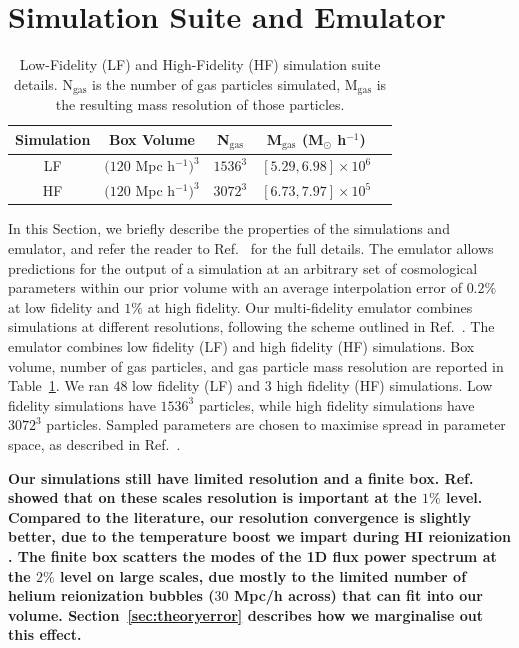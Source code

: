 \section{Simulation Suite and Emulator}
\label{sec:emulator}
\label{sec:simulations}

\begin{table}
	\centering
     \begin{tabular}{|c|c|c|c|c|}
		\hline
		Simulation & Box Volume & N$_{\text{gas}}$ & M$_{\text{gas}}$ (M$_{\odot}$ h$^{-1}$)\\
		\hline
		LF & $(120$ Mpc h$^{-1})^3$ & $1536^3$ & $[5.29, 6.98]\times10^6$\\
		HF & $(120$ Mpc h$^{-1})^3$ & $3072^3$ & $[6.73, 7.97]\times10^5$\\
		\hline
	\end{tabular}
    \caption{\label{table:simulations}
    Low-Fidelity (LF) and High-Fidelity (HF) simulation suite details.
    N$_{\text{gas}}$ is the number of gas particles simulated, M$_{\text{gas}}$ is the resulting mass resolution of those particles.}
\end{table}

In this Section, we briefly describe the properties of the simulations and emulator, and refer the reader to Ref.~\cite{2023simsuite} for the full details.
The emulator allows predictions for the output of a simulation at an arbitrary set of cosmological parameters within our prior volume with an average interpolation error of $0.2\%$ at low fidelity and $1\%$ at high fidelity.
Our multi-fidelity emulator combines simulations at different resolutions, following the scheme outlined in Ref.~\cite{2022MNRAS.517.3200F}.
The emulator combines low fidelity (LF) and high fidelity (HF) simulations.
Box volume, number of gas particles, and gas particle mass resolution are reported in Table~\ref{table:simulations}.
We ran $48$ low fidelity (LF) and $3$ high fidelity (HF) simulations.
Low fidelity simulations have $1536^3$ particles, while high fidelity simulations have $3072^3$ particles.
Sampled parameters are chosen to maximise spread in parameter space, as described in Ref.~\cite{2023simsuite}. 

\textbf{Our simulations still have limited resolution and a finite box. Ref.~\cite{2023simsuite} showed that on these scales resolution is important at the $1\%$ level. Compared to the literature, our resolution convergence is slightly better, due to the temperature boost we impart during HI reionization \cite{2019ApJ...874..154D}. The finite box scatters the modes of the 1D flux power spectrum at the $2\%$ level on large scales, due mostly to the limited number of helium reionization bubbles ($30$ Mpc/h across) that can fit into our volume. Section~\ref{sec:theoryerror} describes how we marginalise out this effect.}


